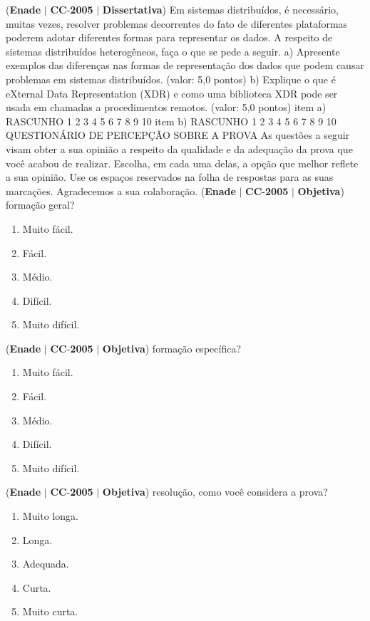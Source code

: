 \documentclass{exam}
\begin{document}
\begin{questions}
\question (\textbf{Enade} $|$ \textbf{CC}-\textbf{2005} $|$ \textbf{Dissertativa})
Em sistemas distribuídos, é necessário, muitas vezes, resolver problemas decorrentes do fato de diferentes plataformas
poderem adotar diferentes formas para representar os dados.
A respeito de sistemas distribuídos heterogêneos, faça o que se pede a seguir.
a) Apresente exemplos das diferenças nas formas de representação dos dados que podem causar problemas em sistemas distribuídos.
(valor: 5,0 pontos)
b) Explique o que é eXternal Data Representation (XDR) e como uma biblioteca XDR pode ser usada em chamadas a procedimentos
remotos. (valor: 5,0 pontos)
item a) RASCUNHO
1
2
3
4
5
6
7
8
9
10
item b) RASCUNHO
1
2
3
4
5
6
7
8
9
10
QUESTIONÁRIO DE PERCEPÇÃO SOBRE A PROVA
As questões a seguir visam obter a sua opinião a respeito da qualidade e da adequação da prova que você acabou
de realizar. Escolha, em cada uma delas, a opção que melhor reflete a sua opinião. Use os espaços reservados na folha
de respostas para as suas marcações.
Agradecemos a sua colaboração.
\question (\textbf{Enade} $|$ \textbf{CC}-\textbf{2005} $|$ \textbf{Objetiva})
formação geral?
	\begin{enumerate}[label=\alph*)]
		\item  Muito fácil.
		\item  Fácil.
		\item  Médio.
		\item  Difícil.
		\item  Muito difícil.
	\end{enumerate}

\question (\textbf{Enade} $|$ \textbf{CC}-\textbf{2005} $|$ \textbf{Objetiva})
formação específica?
	\begin{enumerate}[label=\alph*)]
		\item  Muito fácil.
		\item  Fácil.
		\item  Médio.
		\item  Difícil.
		\item  Muito difícil.
	\end{enumerate}

\question (\textbf{Enade} $|$ \textbf{CC}-\textbf{2005} $|$ \textbf{Objetiva})
resolução, como você considera a prova?
	\begin{enumerate}[label=\alph*)]
		\item  Muito longa.
		\item  Longa.
		\item  Adequada.
		\item  Curta.
		\item  Muito curta.
	\end{enumerate}


\end{questions}
\end{document}
